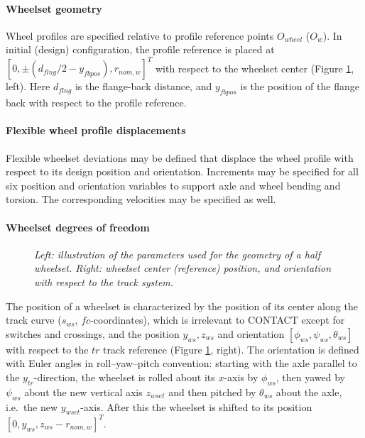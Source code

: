 \documentclass[12pt]{report}
\begin{document}
\paragraph{Wheelset geometry}

Wheel profiles are specified relative to profile reference points
$O_{wheel}$ ($O_w$). In initial (design) configuration, the profile
reference is placed at $[0, \pm (d_{flng}/2-y_{fbpos}), r_{nom,w}]^T$ with
respect to the wheelset center (Figure \ref{fig:wheel_coord}, left). Here
$d_{flng}$ is the flange-back distance, and $y_{fbpos}$ is the position of
the flange back with respect to the profile reference. 


\paragraph{Flexible wheel profile displacements}

Flexible wheelset deviations may be defined that displace the wheel
profile with respect to its design position and orientation.
Increments may be specified for all six position and orientation variables
to support axle and wheel bending and torsion. The corresponding velocities
may be specified as well.

\paragraph{Wheelset degrees of freedom}

\begin{figure}[bt]
\centering
{}
\hspace{10mm}
\caption{\em Left: illustration of the parameters used for the geometry of
        a half wheelset. Right: wheelset center (reference) position,
        and orientation with respect to the track system.}
\label{fig:wheel_coord}
\end{figure}

The position of a wheelset is characterized by the position of its center
along the track curve ($s_{ws}$, $fc$-coordinates), which is irrelevant to
CONTACT except for switches and crossings, and the position $y_{ws},
z_{ws}$ and orientation $[\phi_{ws}, \psi_{ws}, \theta_{ws}]$ with respect
to the $tr$ track reference (Figure \ref{fig:wheel_coord}, right). The
orientation is defined with Euler angles in roll--yaw--pitch convention:
starting with the axle parallel to the $y_{tr}$-direction, the wheelset is
rolled about its $x$-axis by $\phi_{ws}$, then yawed by $\psi_{ws}$ about
the new vertical axis $z_{wset}$ and then pitched by $\theta_{ws}$ about
the axle, i.e.\ the new $y_{wset}$-axis. After this the wheelset is shifted
to its position $[0,y_{ws},z_{ws}-r_{nom,w}]^T$.
\end{document}
